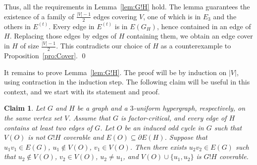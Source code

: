 \documentclass{article}
\newtheorem{claim}[theorem]{Claim}
\theoremstyle{definition}
\begin{document}
Thus, all the requirements in Lemma~\ref{lem:G!H} hold. The lemma guarantees the existence of a family of $\frac{|V|-1}{2}$ edges covering $V$, one of which is in $E_3$ and the others in $E^{(t)}$. Every edge in $E^{(t)}$ is in $E(G_H)$, hence contained in an edge of $H$. Replacing those edges by edges of $H$ containing them, we obtain an edge cover in $H$ of size $\frac{|V|-1}{2}$. This contradicts our choice of $H$ as a counterexample to Proposition~\ref{pro:Cover}. \qed

\vspace{10pt}

It remains to prove Lemma~\ref{lem:G!H}. The proof will be by induction on $|V|$, using contraction in the induction step. The following claim will be useful in this context, and we start with its statement and proof.
\begin{claim} \label{cl:Out}
Let $G$ and $H$ be a graph and a $3$-uniform hypergraph, respectively, on the same vertex set $V$. Assume that $G$ is factor-critical, and every edge of $H$ contains at least two edges of $G$. Let $O$ be an induced odd cycle in $G$ such that $V(O)$ is not $G!H$ coverable and $E(O) \subseteq \partial E(H)$. Suppose that $u_1v_1 \in E(G)$, $u_1 \notin V(O)$, $v_1 \in V(O)$. Then there exists $u_2v_2 \in E(G)$ such that $u_2 \notin V(O)$, $v_2 \in V(O)$, $u_2 \ne u_1$, and $V(O) \cup \{u_1,u_2\}$ is $G!H$ coverable.
\end{claim}
\end{document}
